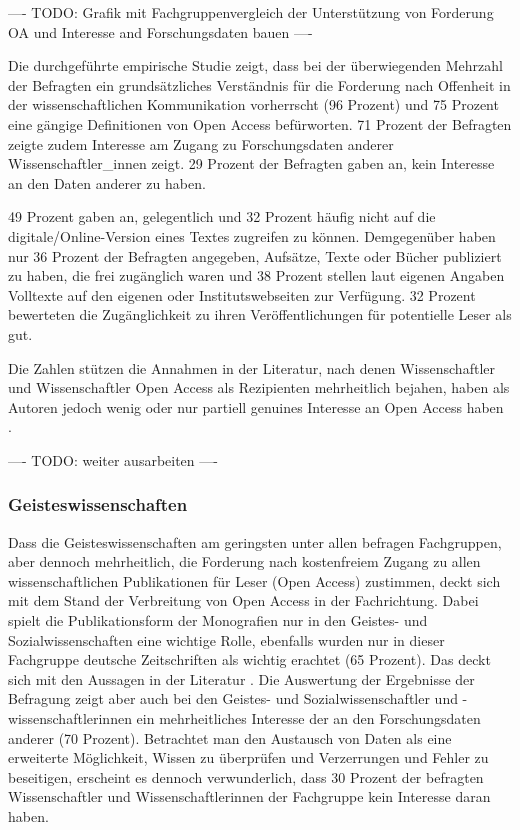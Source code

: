   ---- TODO: Grafik mit Fachgruppenvergleich der Unterstützung von Forderung OA und Interesse and Forschungsdaten bauen  ----

Die durchgeführte empirische Studie zeigt, dass bei der überwiegenden Mehrzahl der Befragten ein grundsätzliches Verständnis für die Forderung nach Offenheit in der wissenschaftlichen Kommunikation vorherrscht (96 Prozent) und 75 Prozent eine gängige Definitionen von Open Access befürworten. 71 Prozent der Befragten zeigte zudem Interesse am Zugang zu Forschungsdaten anderer Wissenschaftler_innen zeigt. 29 Prozent der Befragten gaben an, kein Interesse an den Daten anderer zu haben.

49 Prozent gaben an, gelegentlich und 32 Prozent häufig nicht auf die digitale/Online-Version eines Textes zugreifen zu können. Demgegenüber haben nur 36 Prozent der Befragten angegeben, Aufsätze, Texte oder Bücher publiziert zu haben, die frei zugänglich waren und 38 Prozent stellen laut eigenen Angaben Volltexte auf den eigenen oder Institutswebseiten zur Verfügung. 32 Prozent bewerteten die Zugänglichkeit zu ihren Veröffentlichungen für potentielle Leser als gut.

Die Zahlen stützen die Annahmen in der Literatur, nach denen Wissenschaftler und Wissenschaftler  Open Access als Rezipienten mehrheitlich bejahen, haben als Autoren jedoch wenig oder nur partiell genuines Interesse an Open Access haben \cite{wein_2010_erwerbung}.

---- TODO: weiter ausarbeiten ----

\subsubsection{Geisteswissenschaften}

Dass die Geisteswissenschaften am geringsten unter allen befragen Fachgruppen, aber dennoch mehrheitlich, die Forderung nach kostenfreiem Zugang zu allen wissenschaftlichen Publikationen für Leser (Open Access) zustimmen, deckt sich mit dem Stand der Verbreitung von Open Access in der Fachrichtung. Dabei spielt die Publikationsform der Monografien nur in den Geistes- und Sozialwissenschaften eine wichtige Rolle, ebenfalls wurden nur in dieser Fachgruppe deutsche Zeitschriften als wichtig erachtet  (65 Prozent). Das deckt sich mit den Aussagen in der Literatur \cite{hagner_2015_sache_buches} \cite{naeder_2010_open} \cite{hollricher_wandel_2009} \cite{Lossau_oa_2007}. Die Auswertung der Ergebnisse der Befragung zeigt aber auch bei den Geistes- und Sozialwissenschaftler und -wissenschaftlerinnen ein mehrheitliches Interesse der an den Forschungsdaten anderer (70 Prozent). Betrachtet man den Austausch von Daten als eine erweiterte Möglichkeit, Wissen zu überprüfen und Verzerrungen und Fehler zu beseitigen, erscheint es dennoch verwunderlich, dass 30 Prozent der befragten Wissenschaftler und Wissenschaftlerinnen der Fachgruppe kein Interesse daran haben.

